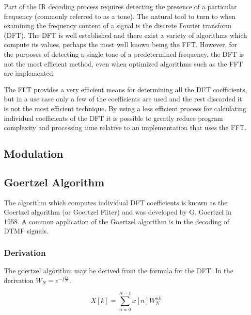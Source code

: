 Part of the IR decoding process requires detecting the presence of a particular frequency (commonly referred to as a tone). The natural tool to turn to when examining the frequency content of a signal is the discrete Fourier transform (DFT). The DFT is well established and there exist a variety of algorithms which compute its values, perhaps the most well known being the FFT. However, for the purposes of detecting a single tone of a predetermined frequency, the DFT is not the most efficient method, even when optimized algorithms such as the FFT are implemented.

The FFT provides a very efficient means for determining all the DFT coefficients, but in a use case only a few of the coefficients are used and the rest discarded it is not the most efficient technique. By using a less efficient process for calculating individual coefficients of the DFT it is possible to greatly reduce program complexity and processing time relative to an implementation that uses the FFT.


\subsection{Modulation}

\subsection{Goertzel Algorithm}

The algorithm which computes individual DFT coefficients is known as the Goertzel algorithm (or Goertzel Filter) and was developed by G. Goertzel in 1958. \cite{Goertzel1958} A common application of the Goertzel algorithm is in the decoding of DTMF\footnotemark{} signals.

\subsubsection{Derivation}
The goertzel algorithm may be derived from the formula for the DFT. In the derivation \(W_N = e^{-j\frac{2\pi}{N}}\).

\begin{equation}
	\label{eqn:dft_defn}
	X[k] = \sum_{n=0}^{N-1}x[n]W_{N}^{nk}
\end{equation}

